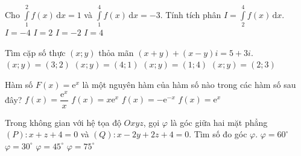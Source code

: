 \begin{ex}%
Cho $\displaystyle\int\limits_{1}^{2} f(x)\mathrm{\,d}x =1$ và $\displaystyle\int\limits_{1}^{4} f(x)\mathrm{\,d}x =-3$. Tính tích phân $I=\displaystyle\int\limits_{2}^{4} f(x)\mathrm{\,d}x$.
\choice
{\True $I=-4$}
{$I=2$}
{$I=-2$}
{$I=4$}
\end{ex}

\begin{ex}%
Tìm cặp số thực $(x;y)$ thỏa mãn $(x+y)+(x-y)i=5+3i$.
\choice
{$(x;y)=(3;2)$}
{\True $(x;y)=(4;1)$}
{$(x;y)=(1;4)$}
{$(x;y)=(2;3)$}
\end{ex}

\begin{ex}%
Hàm số $F(x)=\mathrm{e}^x$ là một nguyên hàm của hàm số nào trong các hàm số sau đây?
\choice
{$f(x)=\dfrac{\mathrm{e}^x}{x}$}
{$f(x)=x\mathrm{e}^x$}
{$f(x)=-\mathrm{e}^{-x}$}
{\True $f(x)=\mathrm{e}^x$}
\end{ex}

\begin{ex}%
Trong không gian với hệ tọa độ $Oxyz$, gọi $\varphi$ là góc giữa hai mặt phẳng $(P)\colon x+z+4=0$ và $(Q)\colon x-2y+2z+4=0$. Tìm số đo góc $\varphi$.
\choice
{$\varphi =60^\circ$}
{$\varphi=30^\circ$}
{\True $\varphi=45^\circ$}
{$\varphi=75^\circ$}
\end{ex}

